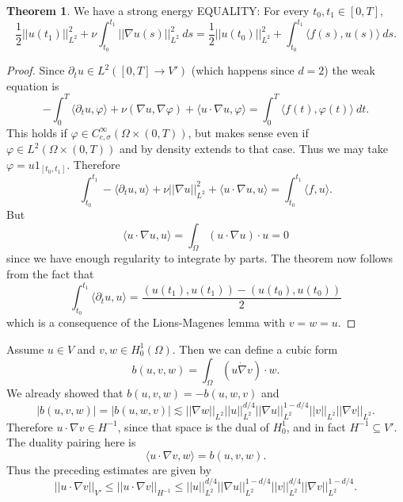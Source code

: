 \documentclass[12pt]{book}
\theoremstyle{definition}
\newtheorem{theorem}{Theorem}[chapter]
\begin{document}
\begin{theorem}
We have a strong energy EQUALITY: For every $t_0, t_1 \in [0, T]$,
$$\frac{1}{2} ||u(t_1)||_{L^2}^2 + \nu\int_{t_0}^{t_1} ||\nabla u(s)||_{L^2}^2 ~ds = \frac{1}{2} ||u(t_0)||_{L^2}^2 + \int_{t_0}^{t_1} \langle f(s), u(s)\rangle ~ds.$$
\end{theorem}
\begin{proof}
Since $\partial_t u \in L^2([0, T] \to V')$ (which happens since $d = 2$) the weak equation is
$$-\int_0^T \langle \partial_t u, \varphi\rangle + \nu(\nabla u, \nabla \varphi) + \langle u \cdot \nabla u, \varphi\rangle = \int_0^T \langle f(t), \varphi(t)\rangle ~dt.$$
This holds if $\varphi \in C^\infty_{c,\sigma}(\Omega \times (0, T))$, but makes sense even if $\varphi \in L^2(\Omega \times (0, T))$ and by density extends to that case.
Thus we may take $\varphi = u1_{[t_0, t_1]}$.
Therefore
$$\int_{t_0}^{t_1} -\langle \partial_t u, u\rangle + \nu ||\nabla u||_{L^2}^2 + \langle u \cdot \nabla u, u\rangle = \int_{t_0}^{t_1} \langle f, u\rangle.$$
But
$$\langle u \cdot \nabla u, u\rangle = \int_\Omega (u \cdot \nabla u) \cdot u = 0$$
since we have enough regularity to integrate by parts.
The theorem now follows from the fact that
$$\int_{t_0}^{t_1} \langle \partial_t u, u\rangle = \frac{(u(t_1), u(t_1)) - (u(t_0), u(t_0))}{2}$$
which is a consequence of the Lions-Magenes lemma with $v = w = u$.
\end{proof}

Assume $u \in V$ and $v, w \in H^1_0(\Omega)$.
Then we can define a cubic form
$$b(u, v, w) = \int_\Omega (u \dot \nabla v) \cdot w.$$
We already showed that $b(u, v, w) = -b(u, w, v)$ and
$$|b(u, v, w)| = |b(u, w, v)| \lesssim ||\nabla w||_{L^2} ||u||_{L^2}^{d/4} ||\nabla u||_{L^2}^{1-d/4} ||v||_{L^2} ||\nabla v||_{L^2}.$$
Therefore $u \cdot \nabla v \in H^{-1}$, since that space is the dual of $H^1_0$, and in fact $H^{-1} \subseteq V'$.
The duality pairing here is
$$\langle u \cdot \nabla v, w\rangle = b(u, v, w).$$
Thus the preceding estimates are given by
$$||u \cdot \nabla v||_{V'} \leq ||u \cdot \nabla v||_{H^{-1}} \leq ||u||_{L^2}^{d/4} ||\nabla u||_{L^2}^{1-d/4} ||v||_{L^2}^{d/4} ||\nabla v||_{L^2}^{1-d/4}.$$
\end{document}
